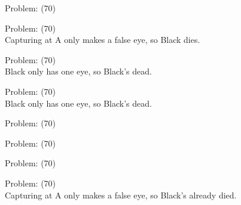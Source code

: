 \documentclass[11pt]{article}
\begin{document}
\begin{minipage}[t]{0.5\textwidth}
  {\centering
  
Problem: (70)\\
  }
\end{minipage}
\begin{minipage}[t]{0.5\textwidth}
  {\centering
  
Problem: (70)\\
Capturing at A only makes a false eye, so Black dies.\\
  }
\end{minipage}
\begin{minipage}[t]{0.5\textwidth}
  {\centering
  
Problem: (70)\\
Black only has one eye, so Black's dead.\\
  }
\end{minipage}
\begin{minipage}[t]{0.5\textwidth}
  {\centering
  
Problem: (70)\\
Black only has one eye, so Black's dead.\\
  }
\end{minipage}
\begin{minipage}[t]{0.5\textwidth}
  {\centering
  
Problem: (70)\\
  }
\end{minipage}
\begin{minipage}[t]{0.5\textwidth}
  {\centering
  
Problem: (70)\\
  }
\end{minipage}
\begin{minipage}[t]{0.5\textwidth}
  {\centering
  
Problem: (70)\\
  }
\end{minipage}
\begin{minipage}[t]{0.5\textwidth}
  {\centering
  
Problem: (70)\\
Capturing at A only makes a false eye, so Black's already died.\\
  }
\end{minipage}
\end{document}

